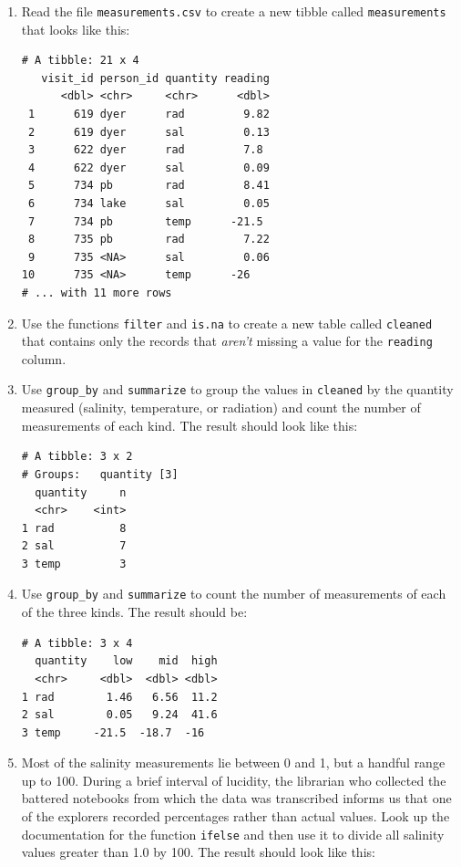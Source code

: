 \begin{enumerate}

\item
  Read the file \texttt{measurements.csv} to create a new tibble called \texttt{measurements}
  that looks like this:

\begin{lstlisting}
# A tibble: 21 x 4
   visit_id person_id quantity reading
      <dbl> <chr>     <chr>      <dbl>
 1      619 dyer      rad         9.82
 2      619 dyer      sal         0.13
 3      622 dyer      rad         7.8 
 4      622 dyer      sal         0.09
 5      734 pb        rad         8.41
 6      734 lake      sal         0.05
 7      734 pb        temp      -21.5 
 8      735 pb        rad         7.22
 9      735 <NA>      sal         0.06
10      735 <NA>      temp      -26   
# ... with 11 more rows
\end{lstlisting}

\item
  Use the functions \texttt{filter} and \texttt{is.na}
  to create a new table called \texttt{cleaned}
  that contains only the records that \emph{aren't} missing a value for the \texttt{reading} column.

\item
  Use \texttt{group\_by} and \texttt{summarize}
  to group the values in \texttt{cleaned} by the quantity measured
  (salinity, temperature, or radiation)
  and count the number of measurements of each kind.
  The result should look like this:

\begin{lstlisting}
# A tibble: 3 x 2
# Groups:   quantity [3]
  quantity     n
  <chr>    <int>
1 rad          8
2 sal          7
3 temp         3
\end{lstlisting}

\item
  Use \texttt{group\_by} and \texttt{summarize}
  to count the number of measurements of each of the three kinds.
  The result should be:

\begin{lstlisting}
# A tibble: 3 x 4
  quantity    low    mid  high
  <chr>     <dbl>  <dbl> <dbl>
1 rad        1.46   6.56  11.2
2 sal        0.05   9.24  41.6
3 temp     -21.5  -18.7  -16  
\end{lstlisting}

\item
  Most of the salinity measurements lie between 0 and 1,
  but a handful range up to 100.
  During a brief interval of lucidity,
  the librarian who collected the battered notebooks from which the data was transcribed
  informs us that one of the explorers recorded percentages rather than actual values.
  Look up the documentation for the function \texttt{ifelse}
  and then use it to divide all salinity values greater than 1.0 by 100.
  The result should look like this:


\end{enumerate}
